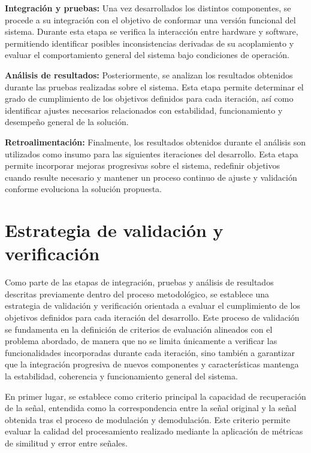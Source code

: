 \textbf{Integración y pruebas:}
Una vez desarrollados los distintos componentes, se procede a su integración con el objetivo de conformar una versión funcional del sistema. Durante esta etapa se verifica la interacción entre hardware y software, permitiendo identificar posibles inconsistencias derivadas de su acoplamiento y evaluar el comportamiento general del sistema bajo condiciones de operación.

\textbf{Análisis de resultados:}
Posteriormente, se analizan los resultados obtenidos durante las pruebas realizadas sobre el sistema. Esta etapa permite determinar el grado de cumplimiento de los objetivos definidos para cada iteración, así como identificar ajustes necesarios relacionados con estabilidad, funcionamiento y desempeño general de la solución.

\textbf{Retroalimentación:}
Finalmente, los resultados obtenidos durante el análisis son utilizados como insumo para las siguientes iteraciones del desarrollo. Esta etapa permite incorporar mejoras progresivas sobre el sistema, redefinir objetivos cuando resulte necesario y mantener un proceso continuo de ajuste y validación conforme evoluciona la solución propuesta.

\section{Estrategia de validación y verificación}

Como parte de las etapas de integración, pruebas y análisis de resultados descritas previamente dentro del proceso metodológico, se establece una estrategia de validación y verificación orientada a evaluar el cumplimiento de los objetivos definidos para cada iteración del desarrollo. Este proceso de validación se fundamenta en la definición de criterios de evaluación alineados con el problema abordado, de manera que no se limita únicamente a verificar las funcionalidades incorporadas durante cada iteración, sino también a garantizar que la integración progresiva de nuevos componentes y características mantenga la estabilidad, coherencia y funcionamiento general del sistema.

En primer lugar, se establece como criterio principal la capacidad de recuperación de la señal, entendida como la correspondencia entre la señal original y la señal obtenida tras el proceso de modulación y demodulación. Este criterio permite evaluar la calidad del procesamiento realizado mediante la aplicación de métricas de similitud y error entre señales.

